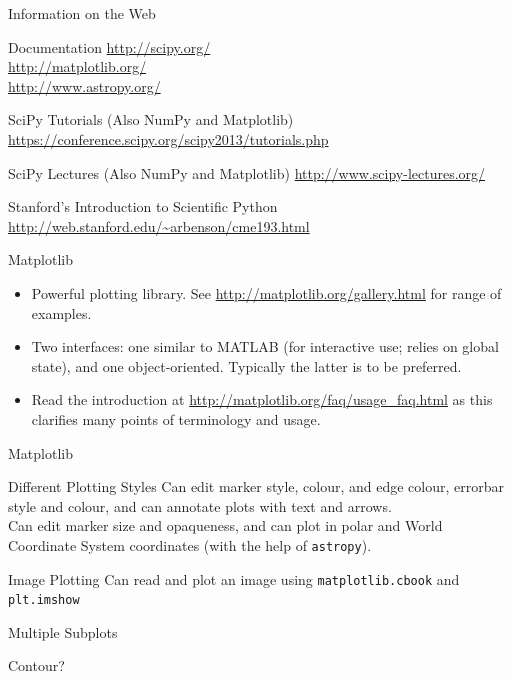 \documentclass{beamer}
\begin{document}
\begin{frame}{Information on the Web}
  \begin{block}{Documentation}
    \url{http://scipy.org/} \\
    \url{http://matplotlib.org/} \\
    \url{http://www.astropy.org/}
  \end{block}

  \begin{block}{SciPy Tutorials (Also NumPy and Matplotlib)}
    \url{https://conference.scipy.org/scipy2013/tutorials.php}
  \end{block}
  
  \begin{block}{SciPy Lectures (Also NumPy and Matplotlib)}
    \url{http://www.scipy-lectures.org/}
  \end{block}
  
  \begin{block}{Stanford's Introduction to Scientific Python}
    \url{http://web.stanford.edu/~arbenson/cme193.html}
  \end{block}
  
\end{frame}

\begin{frame}{Matplotlib}
  \begin{itemize}
    \item Powerful plotting library. See \url{http://matplotlib.org/gallery.html} for range of examples.
    \item Two interfaces: one similar to MATLAB (for interactive use; relies on global state), and one object-oriented. Typically the latter is to be preferred.
    \item Read the introduction at \url{http://matplotlib.org/faq/usage_faq.html} as this clarifies many points of terminology and usage.
  \end{itemize} 
\end{frame}

\begin{frame}{Matplotlib}
  \begin{block}{Different Plotting Styles}
     Can edit marker style, colour, and edge colour, errorbar style and colour, and can annotate plots with text and arrows. \\
     Can edit marker size and opaqueness, and can plot in polar and World Coordinate System coordinates (with the help of \texttt{astropy}).
  \end{block}
  \begin{block}{Image Plotting}
     Can read and plot an image using \texttt{matplotlib.cbook} and \texttt{plt.imshow}
  \end{block}
  \begin{block}{Multiple Subplots}

  \end{block}
  \begin{block}{Contour?}

  \end{block}  
\end{frame}
\end{document}
